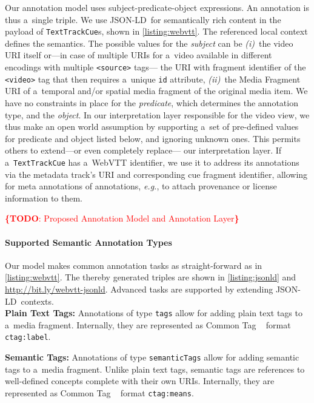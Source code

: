 \documentclass{sig-alternate}
\newcommand{\inlinelistingsize}{\fontsize{8pt}{11pt}}
\let\oldurl\url
\renewcommand{\url}[1]{\inlinelistingsize\oldurl{#1}}
\newcommand{\todo}[1]{\noindent\textcolor{red}{{\bf \{TODO}: #1{\bf \}}}}
\def\JSONLD{\mbox{JSON-LD}}
\begin{document}
Our annotation model uses subject-predicate-object expressions.
An annotation is thus a~single triple.
We use \JSONLD\ for semantically rich content
in the payload of \texttt{TextTrackCue}s, shown in
\autoref{listing:webvtt}.
The referenced local context defines the semantics.
The possible values for the \emph{subject} can be \emph{(i)}~the video
URI itself or---in case of multiple URIs for a~video available
in different encodings with multiple \texttt{<source>} tags---%
the URI with fragment identifier of the \texttt{<video>} tag
that then requires a~unique \texttt{id} attribute,
\emph{(ii)}~the Media Fragment URI of a~temporal and/or spatial
media fragment of the original media item.
We have no constraints in place for the \emph{predicate},
which determines the annotation type, and the \emph{object}.
In our interpretation layer responsible for the video view,
we thus make an open world assumption
by supporting a~set of pre-defined values for predicate and object
listed below, and ignoring unknown ones.
This permits others to extend---or even completely replace---%
our interpretation layer.
If a~\texttt{TextTrackCue} has a~WebVTT identifier,
we use it to address its annotations
via the metadata track's URI
and corresponding cue fragment identifier,
allowing for meta annotations of annotations, \emph{e.g.},
to attach provenance or license information to them.

\todo{Proposed Annotation Model and Annotation Layer}

\paragraph{Supported Semantic Annotation Types}

Our model makes common annotation tasks as
straight-forward as in \autoref{listing:webvtt}.
The thereby generated triples are shown in
\autoref{listing:jsonld} and \url{http://bit.ly/webvtt-jsonld}.
Advanced tasks are supported by extending \JSONLD~contexts.\\

\noindent \textbf{Plain Text Tags:} Annotations of type
  \texttt{tags} allow for add\-ing plain text tags
  to a~media fragment.
  Internally, they are represented as Common Tag%
  ~\cite{commontag2009spec} format \texttt{ctag:label}.

\noindent \textbf{Semantic Tags:} Annotations of type
  \texttt{semanticTags} allow for adding semantic tags
  to a~media fragment.
  Unlike plain text tags, semantic tags are references to
  well-defined concepts complete with their own URIs.
  Internally, they are represented as Common Tag%
  ~\cite{commontag2009spec} format \texttt{ctag:means}.
\end{document}
